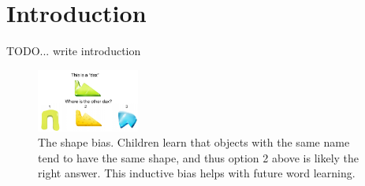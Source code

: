 \section{Introduction}

TODO... write introduction
\begin{figure}[h!]
    \begin{center}
        \includegraphics[width=0.3\textwidth]{figures/shape_bias_demo.pdf}
    \end{center}
    \caption{The shape bias. Children learn that objects with the same name tend to have the
    same shape, and thus option 2 above is likely the right answer. This
    inductive bias helps with future word learning.}
    \label{fig:shape_bias_demo}
\end{figure}

